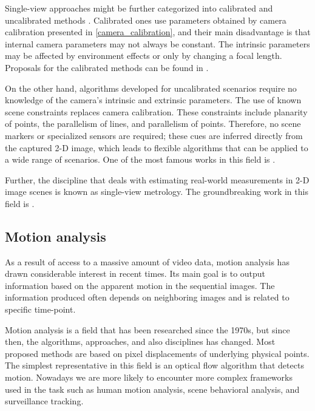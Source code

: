         Single-view approaches might be further categorized into calibrated and uncalibrated methods \cite{criminisi2000single}. Calibrated ones use parameters obtained by camera calibration presented in \ref{camera_calibration}, and their main disadvantage is that internal camera parameters may not always be constant. The intrinsic parameters may be affected by environment effects or only by changing a focal length. Proposals for the calibrated methods can be found in \cite{orteu1997camera, wilczkowiak2001camera, kushal2002simple}.
        
        On the other hand, algorithms developed for uncalibrated scenarios require no knowledge of the camera's intrinsic and extrinsic parameters. The use of known scene constraints replaces camera calibration. These constraints include planarity of points, the parallelism of lines, and parallelism of points. Therefore, no scene markers or specialized sensors are required; these cues are inferred directly from the captured 2-D image, which leads to flexible algorithms that can be applied to a wide range of scenarios. One of the most famous works in this field is \cite{criminisi2012accurate}.

        Further, the discipline that deals with estimating real-world measurements in 2-D image scenes is known as single-view metrology. The groundbreaking work in this field is \cite{criminisi2002single}.
        
    \subsection{Motion analysis}\label{motion_analysis}
        As a result of access to a massive amount of video data, motion analysis \cite{Szeliski:2010:CVA:1941882} has drawn considerable interest in recent times. Its main goal is to output information based on the apparent motion in the sequential images. The information produced often depends on neighboring images and is related to specific time-point. 

        Motion analysis \cite{Szeliski:2010:CVA:1941882} is a field that has been researched since the 1970s, but since then, the algorithms, approaches, and also disciplines has changed. Most proposed methods are based on pixel displacements of underlying physical points. The simplest representative in this field is an optical flow algorithm \cite{horn1981determining} that detects motion. Nowadays we are more likely to encounter more complex frameworks used in the task such as human motion analysis, scene behavioral analysis, and surveillance tracking.
        
